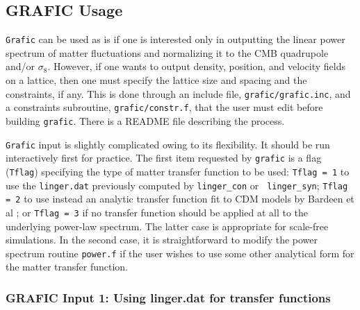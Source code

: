 \subsection{GRAFIC Usage}

{\tt Grafic} can be used as is if one is interested only in outputting
the linear power spectrum of matter fluctuations and normalizing it to
the CMB quadrupole and/or $\sigma_8$.  However, if one wants to output
density, position, and velocity fields on a lattice, then one must
specify the lattice size and spacing and the constraints, if any.
This is done through an include file, {\tt grafic/grafic.inc}, and a
constraints subroutine, {\tt grafic/constr.f}, that the user must edit
before building {\tt grafic}.  There is a README file describing the process.

{\tt Grafic} input is slightly complicated owing to its flexibility.
It should be run interactively first for practice.  The first item
requested by {\tt grafic} is a flag ({\tt Tflag}) specifying the type
of matter transfer function to be used: {\tt Tflag = 1} to use the
{\tt linger.dat} previously computed by {\tt linger\_con} or {\tt
linger\_syn}; {\tt Tflag = 2} to use instead an analytic transfer
function fit to CDM models by Bardeen et al \cite{bbks}; or {\tt Tflag
= 3} if no transfer function should be applied at all to the underlying
power-law spectrum.  The latter case is appropriate for scale-free
simulations.  In the second case, it is straightforward to modify
the power spectrum routine {\tt power.f} if the user wishes to use
some other analytical form for the matter transfer function.

\subsubsection{GRAFIC Input 1: Using linger.dat for transfer functions}
\label{grafic1}

